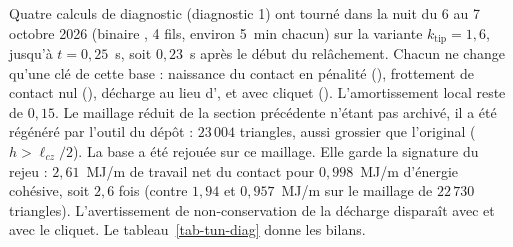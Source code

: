 Quatre calculs de diagnostic (diagnostic 1) ont tourné dans la nuit du 6 au 7 octobre 2026 (binaire , 4 fils, environ 5~min chacun) sur la variante $k_\text{tip} = 1{,}6$, jusqu'à $t = 0{,}25$~s, soit $0{,}23$~s après le début du relâchement. Chacun ne change qu'une clé de cette base : naissance du contact en pénalité (), frottement de contact nul (), décharge  au lieu d', et  avec cliquet (). L'amortissement local reste de $0{,}15$. Le maillage réduit de la section précédente n'étant pas archivé, il a été régénéré par l'outil du dépôt : $23\,004$ triangles, aussi grossier que l'original ($h > \ell_{cz}/2$). La base a été rejouée sur ce maillage. Elle garde la signature du rejeu : $2{,}61$~MJ/m de travail net du contact pour $0{,}998$~MJ/m d'énergie cohésive, soit $2{,}6$ fois (contre $1{,}94$ et $0{,}957$~MJ/m sur le maillage de $22\,730$ triangles). L'avertissement de non-conservation de la décharge  disparaît avec  et avec le cliquet. Le tableau~\ref{tab-tun-diag} donne les bilans.

